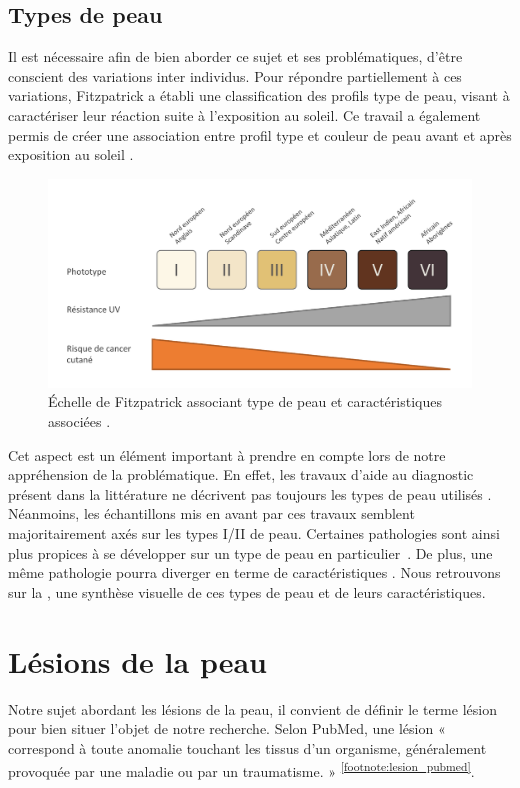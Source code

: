 \subsection{Types de peau}
Il est nécessaire afin de bien aborder ce sujet et ses problématiques, d’être conscient des variations inter individus. Pour répondre partiellement à ces variations, Fitzpatrick a établi une classification des profils type de peau, visant à caractériser leur réaction suite à l’exposition au soleil. Ce travail a également permis de créer une association entre profil type et couleur de peau avant et après exposition au soleil \cite{Fitzpatrick1988}. 
\begin{figure}[H]
    \centering
    \includegraphics[width=0.8\linewidth]{contents/chapter_1/resources/scheme_fitzpatrick_scale.pdf}
    \caption{Échelle de Fitzpatrick associant type de peau et caractéristiques associées \cite{Fitzpatrick1988}.}
    \label{fig:scheme_fitzpatrick_scale}
\end{figure}
Cet aspect est un élément important à prendre en compte lors de notre appréhension de la problématique. En effet, les travaux d'aide au diagnostic présent dans la littérature ne décrivent pas toujours les types de peau utilisés \cite{Celebi2007,Wiltgen2008,Koller2011}. Néanmoins, les échantillons mis en avant par ces travaux semblent majoritairement axés sur les types I/II de peau. Certaines pathologies sont ainsi plus propices à se développer sur un type de peau en particulier~\cite{Narayanan2010}. De plus, une même pathologie pourra diverger en terme de caractéristiques \cite{Tuma2015}. Nous retrouvons sur la , une synthèse visuelle de ces types de peau et de leurs caractéristiques.

\section{Lésions de la peau}
Notre sujet abordant les lésions de la peau, il convient de définir le terme lésion pour bien situer l’objet de notre recherche. Selon PubMed, une lésion « correspond à toute anomalie touchant les tissus d’un organisme, généralement provoquée par une maladie ou par un traumatisme. » \textsuperscript{\ref{footnote:lesion_pubmed}}.\par
\addtocounter{footnote}{1}

